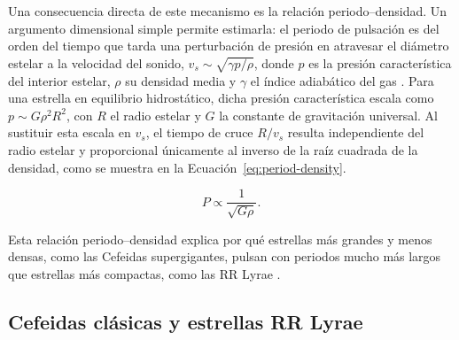 \documentclass[12pt,letterpaper,oneside]{book}
\begin{document}
Una consecuencia directa de este mecanismo es la relaci\'on periodo--densidad. Un argumento dimensional simple permite estimarla: el periodo de pulsaci\'on es del orden del tiempo que tarda una perturbaci\'on de presi\'on en atravesar el di\'ametro estelar a la velocidad del sonido, $v_s\sim\sqrt{\gamma p/\rho}$, donde $p$ es la presi\'on caracter\'istica del interior estelar, $\rho$ su densidad media y $\gamma$ el \'indice adiab\'atico del gas \citep{Carroll2017}. Para una estrella en equilibrio hidrost\'atico, dicha presi\'on caracter\'istica escala como $p\sim G\rho^2R^2$, con $R$ el radio estelar y $G$ la constante de gravitaci\'on universal. Al sustituir esta escala en $v_s$, el tiempo de cruce $R/v_s$ resulta independiente del radio estelar y proporcional \'unicamente al inverso de la ra\'iz cuadrada de la densidad, como se muestra en la Ecuaci\'on~\eqref{eq:period-density}.

\begin{equation}
	P \propto \frac{1}{\sqrt{G\rho}}.
	\label{eq:period-density}
\end{equation}

Esta relaci\'on periodo--densidad explica por qu\'e estrellas m\'as grandes y menos densas, como las Cefeidas supergigantes, pulsan con periodos mucho m\'as largos que estrellas m\'as compactas, como las RR Lyrae \citep{Karttunen2016,Carroll2017}.

\subsection{Cefeidas cl\'asicas y estrellas RR Lyrae}
\end{document}
